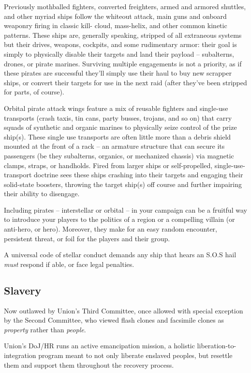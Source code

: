 Previously mothballed fighters, converted freighters, armed and armored shuttles, and other
myriad ships follow the whiteout attack, main guns and onboard weaponry firing in classic kill-
cloud, mass-helix, and other common kinetic patterns. These ships are, generally speaking,
stripped of all extraneous systems but their drives, weapons, cockpits, and some rudimentary
armor: their goal is simply to physically disable their targets and land their payload -- subalterns,
drones, or pirate marines. Surviving multiple engagements is not a priority, as if these pirates are
successful they’ll simply use their haul to buy new scrapper ships, or convert their targets for use
in the next raid (after they’ve been stripped for parts, of course).

Orbital pirate attack wings feature a mix of reusable fighters and single-use transports (crash
taxis, tin cans, party busses, trojans, and so on) that carry squads of synthetic and organic
marines to physically seize control of the prize ship(s). These single use transports are often little
more than a debris shield mounted at the front of a rack -- an armature structure that can secure
its passengers (be they subalterns, organics, or mechanized chassis) via magnetic clamps,
straps, or handholds. Fired from larger ships or self-propelled, single-use-transport doctrine sees
these ships crashing into their targets and engaging their solid-state boosters, throwing the target
ship(s) off course and further impairing their ability to disengage.

Including pirates -- interstellar or orbital -- in your campaign can be a fruitful way to introduce your
players to the politics of a region or a compelling villain (or anti-hero, or hero). Moreover, they
make for an easy random encounter, persistent threat, or foil for the players and their group.

A universal code of stellar conduct demands any ship that hears an S.O.S hail \textit{must} respond if
able, or face legal penalties.

\subsection{Slavery}

Now outlawed by Union’s Third Committee, once allowed with special exception by the Second
Committee, who viewed flash clones and facsimile clones as \textit{property} rather than \textit{people}.

Union’s DoJ/HR runs an active emancipation mission, a holistic liberation-to-integration program
meant to not only liberate enslaved peoples, but resettle them and support them throughout the
recovery process.

